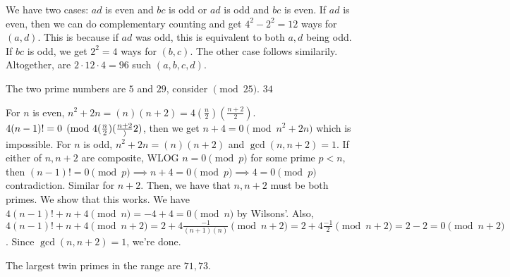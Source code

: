 \documentclass[11pt]{article}
\begin{document}
\begin{sol}
We have two cases: $ad$ is even and $bc$ is odd or $ad$ is odd and $bc$ is even. If $ad$ is even, then we can do complementary counting and get $4^{2}-2^{2}=12$ ways for $(a,d)$. This is because if $ad$ was odd, this is equivalent to both $a,d$ being odd. If $bc$ is odd, we get $2^{2}=4$ ways for $(b,c)$.  The other case follows similarily. Altogether, are $2\cdot 12\cdot 4=\boxed{96}$ such $(a,b,c,d)$.
\end{sol}


\begin{sol}
The two prime numbers are $5$ and $29$, consider $\pmod{25}$. $\boxed{34}$
\end{sol}




\begin{sol}
For $n$ is even, $n^2+2n=(n)(n+2)=4(\frac{n}{2})(\frac{n+2}{2})$. $4(n-1)!=0\pmod{4(\frac{n}{2})(\frac{n+2}}{2})$, then we get $n+4=0\pmod{n^2+2n}$ which is impossible. For $n$ is odd, $n^2+2n=(n)(n+2)$ and $\gcd(n,n+2)=1$. If either of $n, n+2$ are composite, WLOG $n=0\pmod{p}$ for some prime $p<n$, then $(n-1)!=0\pmod{p}\implies n+4=0\pmod{p}\implies 4 =0\pmod{p}$ contradiction. Similar for $n+2$. Then, we have that $n,n+2$ must be both primes. We show that this works. We have $4(n-1)!+n+4\pmod{n}=-4+4=0\pmod{n}$ by Wilsons'. Also, $4(n-1)!+n+4\pmod{n+2}=2+4\frac{-1}{(n+1)(n)}\pmod{n+2}=2+4\frac{-1}{2}\pmod{n+2}=2-2=0\pmod{n+2}$. Since $\gcd(n,n+2)=1$, we're done.

The largest twin primes in the range are $\boxed{71},73$.
\end{sol}
\end{document}
